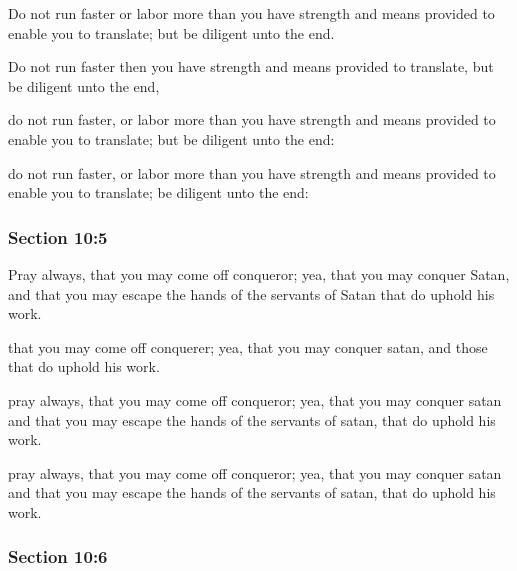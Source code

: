 		Do not run faster or labor more than you have strength and means provided to enable you to translate; but be diligent unto the end.

		\begin{framed}
		\scriptsize
			\begin{compactdesc}
				\item[JSP] Do not run faster then you have strength and means provided to translate, but be diligent unto the end,
				\item[RB1] [\textit{missing}] 
				\item[DC 1835] do not run faster, or labor more than you have strength and means provided to enable you to translate; but be diligent unto the end:
				\item[DC 1844] do not run faster, or labor more than you have strength and means provided to enable you to translate; be diligent unto the end:
			\end{compactdesc}
		\end{framed}

	\subsubsection{Section 10:5} %
		\label{DC10-5}

		Pray always, that you may come off conqueror; yea, that you may conquer Satan, and that you may escape the hands of the servants of Satan that do uphold his work.

		\begin{framed}
		\scriptsize
			\begin{compactdesc}
				\item[JSP]  that you may come off conquerer; yea, that you may conquer satan, and those that do uphold his work.
				\item[RB1] [\textit{missing}] 
				\item[DC 1835] pray always, that you may come off conqueror; yea, that you may conquer satan and that you may escape the hands of the servants of satan, that do uphold his work.
				\item[DC 1844] pray always, that you may come off conqueror; yea, that you may conquer satan and that you may escape the hands of the servants of satan, that do uphold his work.
			\end{compactdesc}
		\end{framed}

	\subsubsection{Section 10:6} %
		\label{DC10-6}

